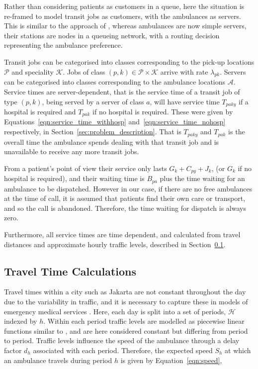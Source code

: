 \documentclass[numbers,webpdf,imaman]{ima-authoring-template}%
\begin{document}
Rather than considering patients as customers in a queue, here the situation
is re-framed to model transit jobs as customers, with the ambulances as
servers. This is similar to the approach of \citet{kergosien15}, whereas
ambulances are now simple servers, their stations are nodes in a queueing
network, with a routing decision representing the ambulance preference.

Transit jobs can be categorised into classes corresponding to the pick-up
locations $\mathcal{P}$ and speciality $\mathcal{K}$. Jobs of class
$(p, k) \in \mathcal{P} \times \mathcal{K}$ arrive with rate $\lambda_{pk}$.
Servers can be categorised into classes corresponding to the ambulance
locations $\mathcal{A}$. Service times are server-dependent, that is the
service time of a transit job of type $(p, k)$, being served by a server of
class $a$, will have service time $T_{paky}$ if a hospital is required and
$T_{pak}$ if no hospital is required. These were given by
Equations~\ref{eqn:service_time_withhosp} and~\ref{eqn:service_time_nohosp}
respectively, in Section~\ref{sec:problem_description}.
That is $T_{paky}$ and $T_{pak}$ is the overall time the ambulance spends
dealing with that transit job and is unavailable to receive any more transit
jobs.

From a patient's point of view their service only lasts $G_k + C_{py} + J_k$,
(or $G_k$ if no hospital is required), and their waiting time is $B_{pa}$ plus
the time waiting for an ambulance to be dispatched. However in our case, if
there are no free ambulances at the time of call, it is assumed that patients
find their own care or transport, and so the call is abandoned. Therefore, the
time waiting for dispatch is always zero.

Furthermore, all service times are time dependent, and calculated from travel
distances and approximate hourly traffic levels, described in
Section~\ref{sec:travel_times}.

\subsection{Travel Time Calculations}\label{sec:travel_times}
Travel times within a city such as Jakarta are not constant throughout the day
due to the variability in traffic, and it is necessary to capture these in
models of emergency medical services \citep{schmiddoerner10}.
Here, each day is split into a set of periods, $\mathcal{H}$ indexed by $h$.
Within each period traffic levels are modelled as piecewise linear functions
similar to \citet{horn00}, and are here considered constant but differing from
period to period. Traffic levels influence the speed of the ambulance through a
delay factor $d_h$ associated with each period. Therefore, the expected speed
$S_h$ at which an ambulance travels during period $h$ is given by
Equation~\ref{eqn:speed},
\end{document}
